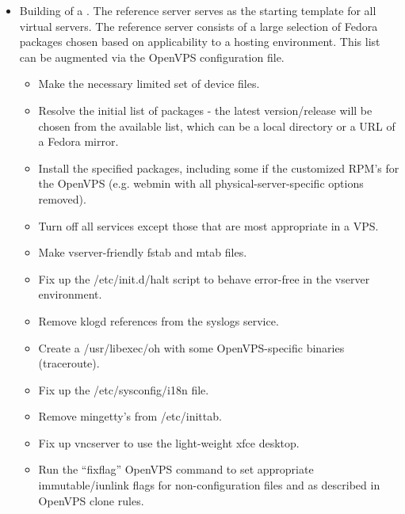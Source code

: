 \begin{itemize}
\begin{itemize}
  \end{itemize}

  \item
    Building of a . The reference server serves
    as the starting template for all virtual servers. The reference
    server consists of a large selection of Fedora packages chosen
    based on applicability to a hosting environment. This list can be
    augmented via the OpenVPS configuration file.

    \begin{itemize}
      
    \item
      Make the necessary limited set of device files.

    \item
      Resolve the initial list of packages - the latest
      version/release will be chosen from the available list, which
      can be a local directory or a URL of a Fedora mirror.

    \item
      Install the specified packages, including some if the
      customized RPM's for the OpenVPS (e.g. webmin with all
      physical-server-specific options removed).

    \item
      Turn off all services except those that are most appropriate
      in a VPS.

    \item
      Make vserver-friendly fstab and mtab files.

    \item
      Fix up the /etc/init.d/halt script to behave error-free in the
      vserver environment.

    \item
      Remove klogd references from the syslogs service.
      
    \item
      Create a /usr/libexec/oh with some OpenVPS-specific binaries
      (traceroute).

    \item
      Fix up the /etc/sysconfig/i18n file.
	
    \item
      Remove mingetty's from /etc/inittab.
      
    \item
      Fix up vncserver to use the light-weight xfce desktop.
      
    \item
      Run the ``fixflag'' OpenVPS command to set appropriate
      immutable/iunlink flags for non-configuration files and as
      described in OpenVPS clone rules.
      

\end{itemize}
\end{itemize}
